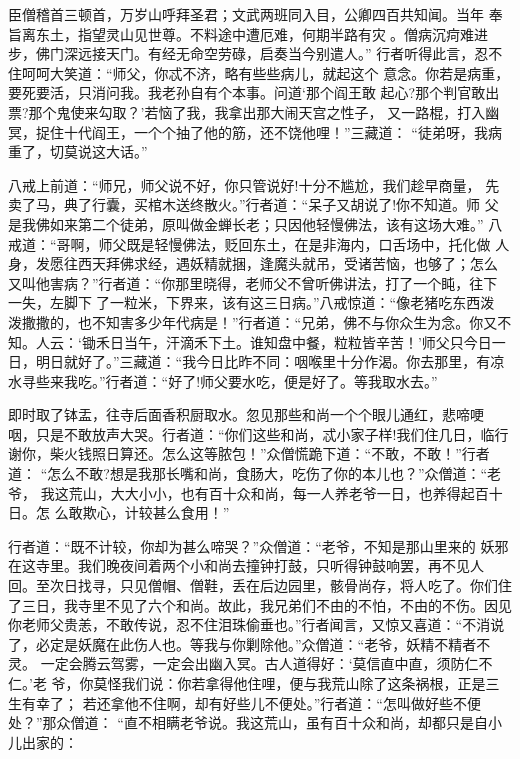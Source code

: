 臣僧稽首三顿首，万岁山呼拜圣君；文武两班同入目，公卿四百共知闻。当年
奉旨离东土，指望灵山见世尊。不料途中遭厄难，何期半路有灾。僧病沉疴难进
步，佛门深远接天门。有经无命空劳碌，启奏当今别遣人。”
行者听得此言，忍不住呵呵大笑道：“师父，你忒不济，略有些些病儿，就起这个
意念。你若是病重，要死要活，只消问我。我老孙自有个本事。问道‘那个阎王敢
起心?那个判官敢出票?那个鬼使来勾取？’若恼了我，我拿出那大闹天宫之性子，
又一路棍，打入幽冥，捉住十代阎王，一个个抽了他的筋，还不饶他哩！”三藏道：
“徒弟呀，我病重了，切莫说这大话。”

八戒上前道：“师兄，师父说不好，你只管说好!十分不尴尬，我们趁早商量，
先卖了马，典了行囊，买棺木送终散火。”行者道：“呆子又胡说了!你不知道。师
父是我佛如来第二个徒弟，原叫做金蝉长老；只因他轻慢佛法，该有这场大难。”
八戒道：“哥啊，师父既是轻慢佛法，贬回东土，在是非海内，口舌场中，托化做
人身，发愿往西天拜佛求经，遇妖精就捆，逢魔头就吊，受诸苦恼，也够了；怎么
又叫他害病？”行者道：“你那里晓得，老师父不曾听佛讲法，打了一个盹，往下
一失，左脚下了一粒米，下界来，该有这三日病。”八戒惊道：“像老猪吃东西泼
泼撒撒的，也不知害多少年代病是！”行者道：“兄弟，佛不与你众生为念。你又不
知。人云：‘锄禾日当午，汗滴禾下土。谁知盘中餐，粒粒皆辛苦！’师父只今日一
日，明日就好了。”三藏道：“我今日比昨不同：咽喉里十分作渴。你去那里，有凉
水寻些来我吃。”行者道：“好了!师父要水吃，便是好了。等我取水去。”

即时取了钵盂，往寺后面香积厨取水。忽见那些和尚一个个眼儿通红，悲啼哽
咽，只是不敢放声大哭。行者道：“你们这些和尚，忒小家子样!我们住几日，临行
谢你，柴火钱照日算还。怎么这等脓包！”众僧慌跪下道：“不敢，不敢！”行者道：
“怎么不敢?想是我那长嘴和尚，食肠大，吃伤了你的本儿也？”众僧道：“老爷，
我这荒山，大大小小，也有百十众和尚，每一人养老爷一日，也养得起百十日。怎
么敢欺心，计较甚么食用！”

行者道：“既不计较，你却为甚么啼哭？”众僧道：“老爷，不知是那山里来的
妖邪在这寺里。我们晚夜间着两个小和尚去撞钟打鼓，只听得钟鼓响罢，再不见人
回。至次日找寻，只见僧帽、僧鞋，丢在后边园里，骸骨尚存，将人吃了。你们住
了三日，我寺里不见了六个和尚。故此，我兄弟们不由的不怕，不由的不伤。因见
你老师父贵恙，不敢传说，忍不住泪珠偷垂也。”行者闻言，又惊又喜道：“不消说
了，必定是妖魔在此伤人也。等我与你剿除他。”众僧道：“老爷，妖精不精者不灵。
一定会腾云驾雾，一定会出幽入冥。古人道得好：‘莫信直中直，须防仁不仁。’老
爷，你莫怪我们说：你若拿得他住哩，便与我荒山除了这条祸根，正是三生有幸了；
若还拿他不住啊，却有好些儿不便处。”行者道：“怎叫做好些不便处？”那众僧道：
“直不相瞒老爷说。我这荒山，虽有百十众和尚，却都只是自小儿出家的：

